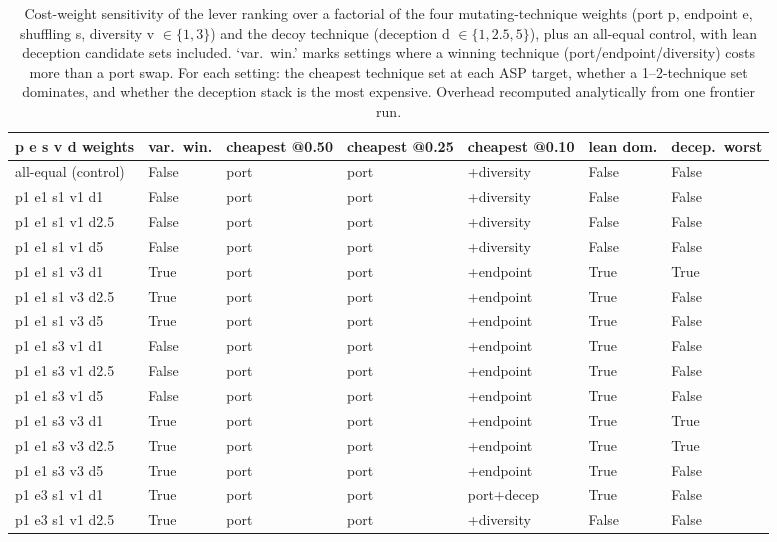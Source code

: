 \begin{table}[t]
\centering
\caption{Cost-weight sensitivity of the lever ranking over a factorial of the four mutating-technique weights (port p, endpoint e, shuffling s, diversity v $\in\{1,3\}$) and the decoy technique (deception d $\in\{1,2.5,5\}$), plus an all-equal control, with lean deception candidate sets included. `var.\ win.' marks settings where a winning technique (port/endpoint/diversity) costs more than a port swap. For each setting: the cheapest technique set at each ASP target, whether a 1--2-technique set dominates, and whether the deception stack is the most expensive. Overhead recomputed analytically from one frontier run.}
\label{tab:cost_weight_sensitivity}
\begin{tabular}{lllllll}
\toprule
p e s v d weights & var.\ win. & cheapest @0.50 & cheapest @0.25 & cheapest @0.10 & lean dom. & decep.\ worst \\
\midrule
all-equal (control) & False & port & port & +diversity & False & False \\
p1 e1 s1 v1 d1 & False & port & port & +diversity & False & False \\
p1 e1 s1 v1 d2.5 & False & port & port & +diversity & False & False \\
p1 e1 s1 v1 d5 & False & port & port & +diversity & False & False \\
p1 e1 s1 v3 d1 & True & port & port & +endpoint & True & True \\
p1 e1 s1 v3 d2.5 & True & port & port & +endpoint & True & False \\
p1 e1 s1 v3 d5 & True & port & port & +endpoint & True & False \\
p1 e1 s3 v1 d1 & False & port & port & +endpoint & True & False \\
p1 e1 s3 v1 d2.5 & False & port & port & +endpoint & True & False \\
p1 e1 s3 v1 d5 & False & port & port & +endpoint & True & False \\
p1 e1 s3 v3 d1 & True & port & port & +endpoint & True & True \\
p1 e1 s3 v3 d2.5 & True & port & port & +endpoint & True & True \\
p1 e1 s3 v3 d5 & True & port & port & +endpoint & True & False \\
p1 e3 s1 v1 d1 & True & port & port & port+decep & True & False \\
p1 e3 s1 v1 d2.5 & True & port & port & +diversity & False & False \\

\end{tabular}
\end{table}
